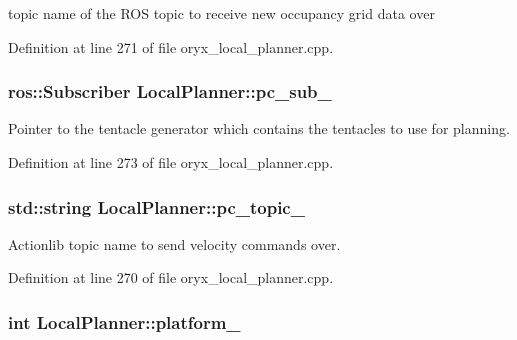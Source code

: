 topic name of the \-R\-O\-S topic to receive new occupancy grid data over 



\-Definition at line 271 of file oryx\-\_\-local\-\_\-planner.\-cpp.

\subsubsection[{pc\-\_\-sub\-\_\-}]{\setlength{\rightskip}{0pt plus 5cm}ros\-::\-Subscriber {\bf \-Local\-Planner\-::pc\-\_\-sub\-\_\-}\hspace{0.3cm}{\ttfamily  [private]}}\label{classLocalPlanner_a5a190e043aa46ffe4d459cf1efbd4d78}


\-Pointer to the tentacle generator which contains the tentacles to use for planning. 



\-Definition at line 273 of file oryx\-\_\-local\-\_\-planner.\-cpp.

\subsubsection[{pc\-\_\-topic\-\_\-}]{\setlength{\rightskip}{0pt plus 5cm}std\-::string {\bf \-Local\-Planner\-::pc\-\_\-topic\-\_\-}\hspace{0.3cm}{\ttfamily  [private]}}\label{classLocalPlanner_ab7b4031d03a074a4fb683606ee87cadc}


\-Actionlib topic name to send velocity commands over. 



\-Definition at line 270 of file oryx\-\_\-local\-\_\-planner.\-cpp.

\subsubsection[{platform\-\_\-}]{\setlength{\rightskip}{0pt plus 5cm}int {\bf \-Local\-Planner\-::platform\-\_\-}\hspace{0.3cm}{\ttfamily  [private]}}\label{classLocalPlanner_a96e21935e453518a9760e78cc722b271}


